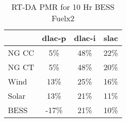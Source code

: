 \begin{table}[htbp]
\centering
\begin{tabular}{lccc}
\toprule
\hline
 & dlac-p & dlac-i & slac \\
\hline
\quad NG CC & 5\% & 48\% & 22\% \\
\quad NG CT & 5\% & 48\% & 20\% \\
\quad Wind & 13\% & 25\% & 16\% \\
\quad Solar & 13\% & 21\% & 11\% \\
\quad BESS & -17\% & 21\% & 10\% \\
\hline
\bottomrule
\end{tabular}
\caption{RT-DA PMR for 10 Hr BESS Fuelx2}
\label{tab:table4_10_Hr_BESS_Fuelx2}
\end{table}
